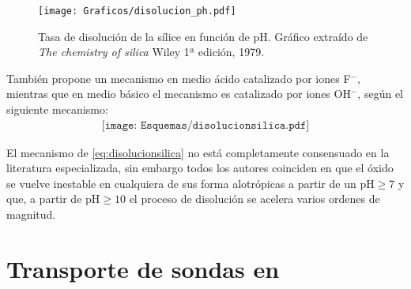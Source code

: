 			\begin{figure}[th!]
			\centering
 	       	\texttt{[image: Graficos/disolucion\_ph.pdf]}
	       		\caption[Tasa de disolución sílice en función del pH]{Tasa de disolución de la sílice en función de pH. Gráfico extraído de \textit{The chemistry of silica} Wiley 1ª edición, 1979.\cite{iler1979}}
	         	\label{fig:disolucion_ph}
	     		\end{figure}
	
	También propone un mecanismo en medio ácido catalizado por iones F$^-$, mientras que en medio básico el mecanismo es catalizado por iones OH$^-$, según el siguiente mecanismo:
			\begin{equation}
				\begin{aligned}
				\texttt{[image: Esquemas/disolucionsilica.pdf]}
				\label{eq:disolucionsilica}
				\end{aligned}
				\end{equation} 
	
	El mecanismo de \ref{eq:disolucionsilica} no está completamente consensuado en la literatura especializada, sin embargo todos los autores coinciden en que el óxido se vuelve inestable en cualquiera de sus forma alotrópicas a partir de un $\text{pH}\geq7$ y que, a partir de $\text{pH}\geq10$ el proceso de disolución se acelera varios ordenes de magnitud.\cite{Kosmulski2002,Kosmulski2014,Schwarz1984,Si-HanWu2013,iler1979}

	
				

\section{Transporte de sondas en \pdm}

